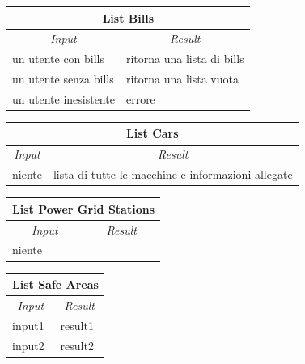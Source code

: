 \documentclass[english]{article}
\begin{document}
\begin{center}
	\begin{tabular}{ | m{6cm} | m{6cm} | }
		\hline 
		\multicolumn{2}{|c|}{\textbf{List Bills}} \\
		\hline
		\multicolumn{1}{|c|}{\textit{Input}} & \multicolumn{1}{c|}{\textit{Result}} \\
		\hline
		un utente con bills & ritorna una lista di bills \\
		\hline
		un utente senza bills & ritorna una lista vuota \\
		\hline
		un utente inesistente & errore \\
		\hline
	\end{tabular}
\end{center}

\begin{center}
	\begin{tabular}{ | m{6cm} | m{6cm} | }
		\hline 
		\multicolumn{2}{|c|}{\textbf{List Cars}} \\
		\hline
		\multicolumn{1}{|c|}{\textit{Input}} & \multicolumn{1}{c|}{\textit{Result}} \\
		\hline
		niente & lista di tutte le macchine e informazioni allegate \\
		\hline
	\end{tabular}
\end{center}

\begin{center}
	\begin{tabular}{ | m{6cm} | m{6cm} | }
		\hline 
		\multicolumn{2}{|c|}{\textbf{List Power Grid Stations}} \\
		\hline
		\multicolumn{1}{|c|}{\textit{Input}} & \multicolumn{1}{c|}{\textit{Result}} \\
		\hline
		niente &  \\
		\hline
	\end{tabular}
\end{center}

\begin{center}
	\begin{tabular}{ | m{6cm} | m{6cm} | }
		\hline 
		\multicolumn{2}{|c|}{\textbf{List Safe Areas}} \\
		\hline
		\multicolumn{1}{|c|}{\textit{Input}} & \multicolumn{1}{c|}{\textit{Result}} \\
		\hline
		input1 & result1 \\
		\hline
		input2 & result2 \\
		\hline
	\end{tabular}
\end{center}
\end{document}
